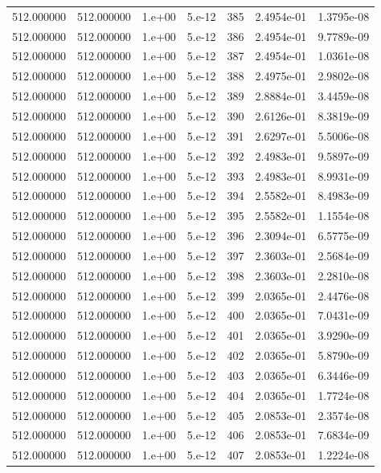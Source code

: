 \begin{table}[htbp]
\begin{tabular}{rrrrrrr}
512.000000 & 512.000000 & 1.e+00 & 5.e-12 & 385 & 2.4954e-01 & 1.3795e-08 \\
512.000000 & 512.000000 & 1.e+00 & 5.e-12 & 386 & 2.4954e-01 & 9.7789e-09 \\
512.000000 & 512.000000 & 1.e+00 & 5.e-12 & 387 & 2.4954e-01 & 1.0361e-08 \\
512.000000 & 512.000000 & 1.e+00 & 5.e-12 & 388 & 2.4975e-01 & 2.9802e-08 \\
512.000000 & 512.000000 & 1.e+00 & 5.e-12 & 389 & 2.8884e-01 & 3.4459e-08 \\
512.000000 & 512.000000 & 1.e+00 & 5.e-12 & 390 & 2.6126e-01 & 8.3819e-09 \\
512.000000 & 512.000000 & 1.e+00 & 5.e-12 & 391 & 2.6297e-01 & 5.5006e-08 \\
512.000000 & 512.000000 & 1.e+00 & 5.e-12 & 392 & 2.4983e-01 & 9.5897e-09 \\
512.000000 & 512.000000 & 1.e+00 & 5.e-12 & 393 & 2.4983e-01 & 8.9931e-09 \\
512.000000 & 512.000000 & 1.e+00 & 5.e-12 & 394 & 2.5582e-01 & 8.4983e-09 \\
512.000000 & 512.000000 & 1.e+00 & 5.e-12 & 395 & 2.5582e-01 & 1.1554e-08 \\
512.000000 & 512.000000 & 1.e+00 & 5.e-12 & 396 & 2.3094e-01 & 6.5775e-09 \\
512.000000 & 512.000000 & 1.e+00 & 5.e-12 & 397 & 2.3603e-01 & 2.5684e-09 \\
512.000000 & 512.000000 & 1.e+00 & 5.e-12 & 398 & 2.3603e-01 & 2.2810e-08 \\
512.000000 & 512.000000 & 1.e+00 & 5.e-12 & 399 & 2.0365e-01 & 2.4476e-08 \\
512.000000 & 512.000000 & 1.e+00 & 5.e-12 & 400 & 2.0365e-01 & 7.0431e-09 \\
512.000000 & 512.000000 & 1.e+00 & 5.e-12 & 401 & 2.0365e-01 & 3.9290e-09 \\
512.000000 & 512.000000 & 1.e+00 & 5.e-12 & 402 & 2.0365e-01 & 5.8790e-09 \\
512.000000 & 512.000000 & 1.e+00 & 5.e-12 & 403 & 2.0365e-01 & 6.3446e-09 \\
512.000000 & 512.000000 & 1.e+00 & 5.e-12 & 404 & 2.0365e-01 & 1.7724e-08 \\
512.000000 & 512.000000 & 1.e+00 & 5.e-12 & 405 & 2.0853e-01 & 2.3574e-08 \\
512.000000 & 512.000000 & 1.e+00 & 5.e-12 & 406 & 2.0853e-01 & 7.6834e-09 \\
512.000000 & 512.000000 & 1.e+00 & 5.e-12 & 407 & 2.0853e-01 & 1.2224e-08 \\

\end{tabular}
\end{table}
